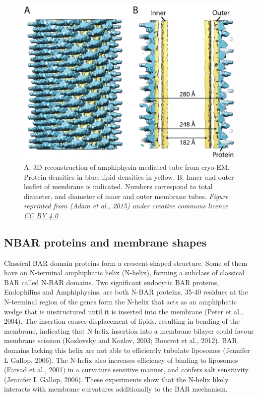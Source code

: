		
\begin{figure}[H]
	\centering
\includegraphics[scale=0.4]{figures/intro/BAR_scaffold}
\caption[BAR domain scaffolds]
{A: 3D reconstruction of amphiphysin-mediated tube from cryo-EM. Protein densities in blue,  lipid densities in yellow. B: Inner and outer leaflet of membrane is indicated. Numbers correspond to total diameter, and diameter of inner and outer membrane tubes. \textit{Figure reprinted from (Adam et al., 2015) under creative commons licence \href{https://creativecommons.org/licenses/by/4.0/}{CC BY 4.0}}
\label{intro_barscaffold}}
	\end{figure}



	\subsection{NBAR proteins and membrane shapes}	
Classical BAR domain proteins form a crescent-shaped structure. Some of them have an N-terminal amphiphatic helix (N-helix), forming a subclass of classical BAR called N-BAR domains. Two significant endocytic BAR proteins, Endophilins and Amphiphysins, are both N-BAR proteins. 35-40 residues at the N-terminal region of the genes form the N-helix that acts as an amphiphatic wedge that is unstructured until it is inserted into the membrane (Peter et al., 2004). The insertion causes displacement of lipids, resulting in bending of the membrane, indicating that N-helix insertion into a membrane bilayer could favour membrane scission (Kozlovsky and Kozlov, 2003; Boucrot et al., 2012). BAR domains lacking this helix are not able to efficiently tubulate  liposomes (Jennifer L Gallop, 2006). The N-helix also increases efficiency of binding to liposomes (Farsad et al., 2001) in a curvature sensitive manner, and confers salt sensitivity (Jennifer L Gallop, 2006). These experiments show that the N-helix likely interacts with membrane curvatures additionally to the BAR mechanism. 



